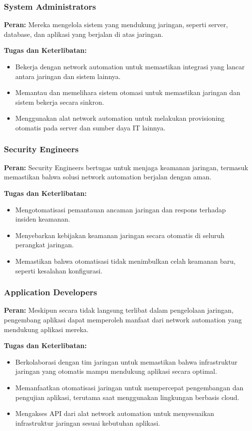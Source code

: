 \subsubsection{System Administrators}

\textbf{Peran:} Mereka mengelola sistem yang mendukung jaringan, seperti server, database, dan aplikasi yang berjalan di atas jaringan.

\textbf{Tugas dan Keterlibatan:}
\begin{itemize}
    \item Bekerja dengan network automation untuk memastikan integrasi yang lancar antara jaringan dan sistem lainnya.
    \item Memantau dan memelihara sistem otomasi untuk memastikan jaringan dan sistem bekerja secara sinkron.
    \item Menggunakan alat network automation untuk melakukan provisioning otomatis pada server dan sumber daya IT lainnya.
\end{itemize}

\subsubsection{Security Engineers}

\textbf{Peran:} Security Engineers bertugas untuk menjaga keamanan jaringan, termasuk memastikan bahwa solusi network automation berjalan dengan aman.

\textbf{Tugas dan Keterlibatan:}
\begin{itemize}
    \item Mengotomatisasi pemantauan ancaman jaringan dan respons terhadap insiden keamanan.
    \item Menyebarkan kebijakan keamanan jaringan secara otomatis di seluruh perangkat jaringan.
    \item Memastikan bahwa otomatisasi tidak menimbulkan celah keamanan baru, seperti kesalahan konfigurasi.
\end{itemize}

\subsubsection{Application Developers}

\textbf{Peran:} Meskipun secara tidak langsung terlibat dalam pengelolaan jaringan, pengembang aplikasi dapat memperoleh manfaat dari network automation yang mendukung aplikasi mereka.

\textbf{Tugas dan Keterlibatan:}
\begin{itemize}
    \item Berkolaborasi dengan tim jaringan untuk memastikan bahwa infrastruktur jaringan yang otomatis mampu mendukung aplikasi secara optimal.
    \item Memanfaatkan otomatisasi jaringan untuk mempercepat pengembangan dan pengujian aplikasi, terutama saat menggunakan lingkungan berbasis cloud.
    \item Mengakses API dari alat network automation untuk menyesuaikan infrastruktur jaringan sesuai kebutuhan aplikasi.
\end{itemize}

